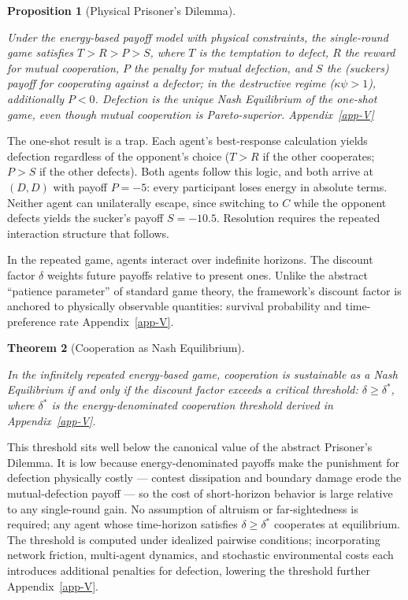 \documentclass[11pt]{article}
\theoremstyle{plain}
\newtheorem{theorem}{Theorem}
\newtheorem{proposition}[theorem]{Proposition}
\theoremstyle{definition}
\theoremstyle{remark}
\begin{document}
\begin{proposition}[Physical Prisoner's Dilemma]
\label{ethics-prop-physical-pd}

Under the energy-based payoff model with physical constraints, the single-round game satisfies $T > R > P > S$, where $T$ is the temptation to defect, $R$ the reward for mutual cooperation, $P$ the penalty for mutual defection, and $S$ the (suckers) payoff for cooperating against a defector; in the destructive regime ($\kappa\psi > 1$), additionally $P < 0$. Defection is the unique Nash Equilibrium of the one-shot game, even though mutual cooperation is Pareto-superior. Appendix~\ref{app-V}
\end{proposition}

The one-shot result is a trap. Each agent's best-response calculation
yields defection regardless of the opponent's choice (\(T > R\) if the
other cooperates; \(P > S\) if the other defects). Both agents follow
this logic, and both arrive at \((D, D)\) with payoff \(P = -5\): every
participant loses energy in absolute terms. Neither agent can
unilaterally escape, since switching to \(C\) while the opponent defects
yields the sucker's payoff \(S = -10.5\). Resolution requires the
repeated interaction structure that follows.

In the repeated game, agents interact over indefinite horizons. The
discount factor \(\delta\) weights future payoffs relative to present
ones. Unlike the abstract ``patience parameter'' of standard game
theory, the framework's discount factor is anchored to physically
observable quantities: survival probability and time-preference rate
Appendix~\ref{app-V}.

\begin{theorem}[Cooperation as Nash Equilibrium]
\label{ethics-thm-cooperation}

In the infinitely repeated energy-based game, cooperation is sustainable as a Nash Equilibrium if and only if the discount factor exceeds a critical threshold: $\delta \geq \delta^*$, where $\delta^*$ is the energy-denominated cooperation threshold derived in Appendix~\ref{app-V}.
\end{theorem}

This threshold sits well below the canonical value of the abstract
Prisoner's Dilemma. It is low because energy-denominated payoffs make
the punishment for defection physically costly --- contest dissipation
and boundary damage erode the mutual-defection payoff --- so the cost of
short-horizon behavior is large relative to any single-round gain. No
assumption of altruism or far-sightedness is required; any agent whose
time-horizon satisfies \(\delta \geq \delta^*\) cooperates at
equilibrium. The threshold is computed under idealized pairwise
conditions; incorporating network friction, multi-agent dynamics, and
stochastic environmental costs each introduces additional penalties for
defection, lowering the threshold further Appendix~\ref{app-V}.
\end{document}
